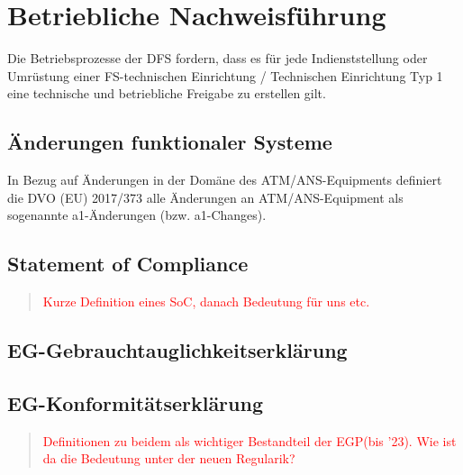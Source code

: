    \pagebreak
    \section{Betriebliche Nachweisführung}

Die Betriebsprozesse der \ac{DFS} fordern, dass es für jede Indienststellung oder Umrüstung einer FS-technischen Einrichtung / Technischen Einrichtung Typ 1 eine technische und betriebliche Freigabe zu erstellen gilt. \cite{fa_freigaben}

\subsection{Änderungen funktionaler Systeme}

In Bezug auf Änderungen in der Domäne des ATM/ANS-Equipments definiert die DVO (EU) 2017/373 alle Änderungen an ATM/ANS-Equipment als sogenannte a1-Änderungen (bzw. a1-Changes).




        \pagebreak
        \subsection{Statement of Compliance}

        \begin{quote}
\textcolor{red}{Kurze Definition eines SoC, danach Bedeutung für uns etc.}
\end{quote}

        \pagebreak
        \subsection{EG-Gebrauchtauglichkeitserklärung}
        \subsection{EG-Konformitätserklärung}

\begin{quote}
\textcolor{red}{Definitionen zu beidem als wichtiger Bestandteil der EGP(bis '23). Wie ist da die Bedeutung unter der neuen Regularik?}
\end{quote}
        
